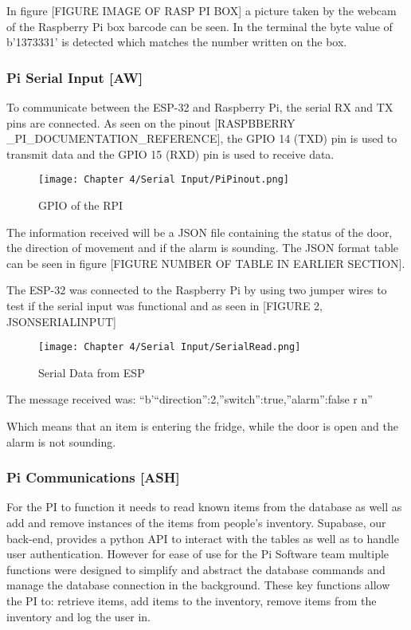 In figure [FIGURE IMAGE OF RASP PI BOX] a picture taken by the webcam of the Raspberry Pi box barcode can be seen.
In the terminal the byte value of b'1373331' is detected which matches the number written on the box.

\subsubsection{Pi Serial Input [AW]}

To communicate between the ESP-32 and Raspberry Pi, the serial RX and TX pins are connected.
As seen on the pinout [RASPBBERRY \_PI\_DOCUMENTATION\_REFERENCE], the GPIO 14 (TXD) pin is used to transmit data and the GPIO 15 (RXD) pin is used to receive data.

\begin{figure}[H]        
    \centering
    \texttt{[image: Chapter 4/Serial Input/PiPinout.png]}
    \caption{GPIO of the RPI}
    \label{fig:rpigpio} 
\end{figure} 

The information received will be a JSON file containing the status of the door, the direction of movement and if the alarm is sounding.
The JSON format table can be seen in figure [FIGURE NUMBER OF TABLE IN EARLIER SECTION].

The ESP-32 was connected to the Raspberry Pi by using two jumper wires to test if the serial input was functional and as seen in [FIGURE 2, JSONSERIALINPUT]

\begin{figure}[H]        
    \centering
    \texttt{[image: Chapter 4/Serial Input/SerialRead.png]}
    \caption{Serial Data from ESP}
    \label{fig:rpiserial} 
\end{figure} 

The message received was: “b'{“direction”:2,”switch”:true,”alarm”:false} r n”

Which means that an item is entering the fridge, while the door is open and the alarm is not sounding.

\subsubsection{Pi Communications [ASH]}

For the PI to function it needs to read known items from the database as well as add and remove instances of the items from people's inventory.
Supabase, our back-end, provides a python API to interact with the tables as well as to handle user authentication.
However for ease of use for the Pi Software team multiple functions were designed to simplify and abstract the database commands and manage the database connection in the background.
These key functions allow the PI to: retrieve items, add items to the inventory, remove items from the inventory and log the user in.

